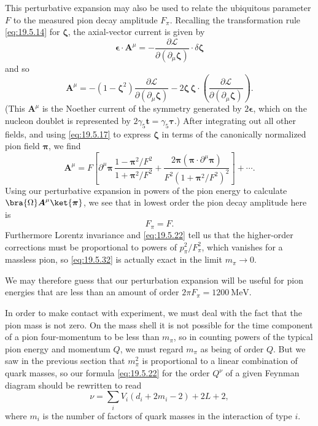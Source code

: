 This perturbative expansion may also be used to relate the ubiquitous parameter $F$ to the measured pion decay amplitude $F_\pi$. Recalling the transformation rule \eqref{eq:19.5.14} for $\boldsymbol{\zeta}$, the axial-vector current is given by
\[
\boldsymbol{\epsilon}\cdot\boldsymbol A^\mu
=-\frac{\partial\mathcal L}
{\partial(\partial_\mu\boldsymbol{\zeta})}
\cdot\delta\boldsymbol{\zeta}
\]
and so
\begin{equation}
\boldsymbol A^\mu
=-(1-\boldsymbol{\zeta}^2)
\frac{\partial\mathcal L}
{\partial(\partial_\mu\boldsymbol{\zeta})}
-2\boldsymbol{\zeta}\,
\boldsymbol{\zeta}\cdot
\left(
\frac{\partial\mathcal L}
{\partial(\partial_\mu\boldsymbol{\zeta})}
\right).
\tag{19.5.30}\label{eq:19.5.30}
\end{equation}
(This $\boldsymbol A^\mu$ is the Noether current of the symmetry generated by $2\boldsymbol{\epsilon}$, which on the nucleon doublet is represented by $2\gamma_5\boldsymbol t=\gamma_5\boldsymbol{\tau}$.) After integrating out all other fields, and using \eqref{eq:19.5.17} to express $\boldsymbol{\zeta}$ in terms of the canonically normalized pion field $\boldsymbol{\pi}$, we find
\begin{equation}
\boldsymbol A^\mu
=F\left[
\partial^\mu\boldsymbol{\pi}\,
\frac{1-\boldsymbol{\pi}^2/F^2}
{1+\boldsymbol{\pi}^2/F^2}
+\frac{2\boldsymbol{\pi}
(\boldsymbol{\pi}\cdot\partial^\mu\boldsymbol{\pi})}
{F^2(1+\boldsymbol{\pi}^2/F^2)^2}
\right]+\cdots.
\tag{19.5.31}\label{eq:19.5.31}
\end{equation}
Using our perturbative expansion in powers of the pion energy to calculate $\bra{\Omega}\boldsymbol A^\mu\ket{\boldsymbol{\pi}}$, we see that in lowest order the pion decay amplitude here is
\begin{equation}
F_\pi=F.
\tag{19.5.32}\label{eq:19.5.32}
\end{equation}
Furthermore Lorentz invariance and \eqref{eq:19.5.22} tell us that the higher-order corrections must be proportional to powers of $p_\pi^2/F_\pi^2$, which vanishes for a massless pion, so \eqref{eq:19.5.32} is actually exact in the limit $m_\pi\to0$.

We may therefore guess that our perturbation expansion will be useful for pion energies that are less than an amount of order $2\pi F_\pi=1200\ \mathrm{MeV}$.

In order to make contact with experiment, we must deal with the fact that the pion mass is not zero. On the mass shell it is not possible for the time component of a pion four-momentum to be less than $m_\pi$, so in counting powers of the typical pion energy and momentum $Q$, we must regard $m_\pi$ as being of order $Q$. But we saw in the previous section that $m_\pi^2$ is proportional to a linear combination of quark masses, so our formula \eqref{eq:19.5.22} for the order $Q^\nu$ of a given Feynman diagram should be rewritten to read
\begin{equation}
\nu=\sum_iV_i(d_i+2m_i-2)+2L+2,
\tag{19.5.33}\label{eq:19.5.33}
\end{equation}
where $m_i$ is the number of factors of quark masses in the interaction of type $i$.

